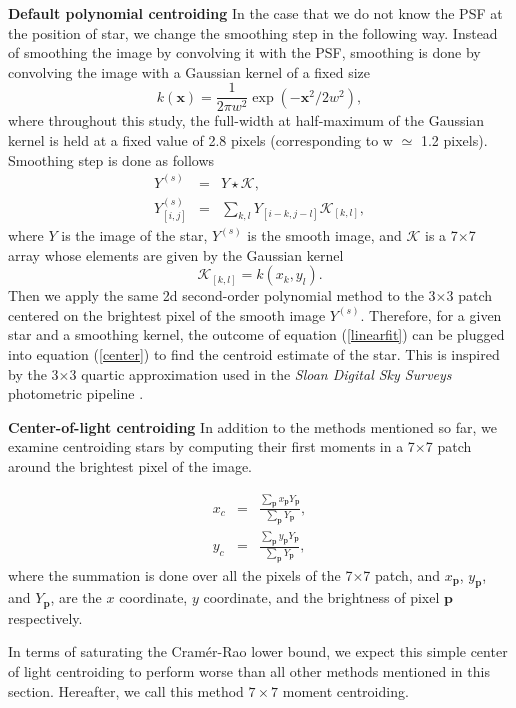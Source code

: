 \documentclass[12pt, preprint]{aastex}
\newcommand{\beq}{\begin{equation}}
\newcommand{\eeq}{\end{equation}}
\begin{document}
\begin{description}
\item{{\bf Default polynomial centroiding}} \quad In the case that 
we do not know the PSF at the position of star, we change 
the smoothing step in the following way. Instead of smoothing the image 
by convolving it with the PSF, smoothing is done by convolving the image 
with a Gaussian kernel of a fixed size 
\beq
k(\mathbf{x}) = \frac{1}{2\pi w^2}\exp(-\mathbf{x}^{2}/2w^{2}),
\eeq
where throughout this study, the full-width at half-maximum of the Gaussian kernel is held at
a fixed value of 2.8 pixels (corresponding to w $\simeq$ 1.2 pixels). Smoothing step is done as follows
\begin{eqnarray}
Y^{(s)} &=& Y \star \mathcal{K}, \\
Y^{(s)}_{[i,j]} &=& \sum_{k,l}Y_{[i-k,j-l]}\mathcal{K}_{[k,l]},
\end{eqnarray}
where $Y$ is the image of the star, $Y^{(s)}$ is the smooth image, and $\mathcal{K}$ is a 7$\times$7 
array whose elements are given by the Gaussian kernel
\beq
\mathcal{K}_{[k,l]} = k(x_{k},y_{l}).
\eeq 
Then we apply the same 2d second-order polynomial method to the 3$\times$3 patch centered on the brightest
pixel of the smooth image $Y^{(s)}$. Therefore, for a given star and a smoothing kernel,
the outcome of equation (\ref{linearfit}) can be
plugged into equation (\ref{center}) to find the centroid estimate
of the star. This is inspired by the 3$\times$3 quartic approximation 
used in the \textsl{Sloan Digital Sky Surveys} photometric pipeline \citep{sdss}.

\item{{\bf Center-of-light centroiding}} \quad In addition to the methods 
mentioned so far, we examine centroiding stars by computing their first moments
in a 7$\times$7 patch around the brightest pixel of the image.

\begin{eqnarray}
x_{c} &=& \frac{\sum_\mathbf{p}x_{\mathbf{p}}Y_{\mathbf{p}}}{\sum_\mathbf{p}Y_{\mathbf{p}}}, \\
y_{c} &=& \frac{\sum_\mathbf{p}y_{\mathbf{p}}Y_{\mathbf{p}}}{\sum_\mathbf{p}Y_{\mathbf{p}}},
\end{eqnarray}
where the summation is done over all the pixels of the 7$\times$7 patch, and $x_{\mathbf{p}}$, 
$y_{\mathbf{p}}$, and $Y_{\mathbf{p}}$, are the $x$ coordinate, $y$ coordinate, and the brightness
of pixel $\mathbf{p}$ respectively.

In terms of saturating the Cram\'{e}r-Rao lower bound, we expect this simple 
center of light centroiding to perform worse than all other methods mentioned in 
this section. Hereafter, we call this method $7\times7$ moment centroiding.

\end{description}
\end{document}

